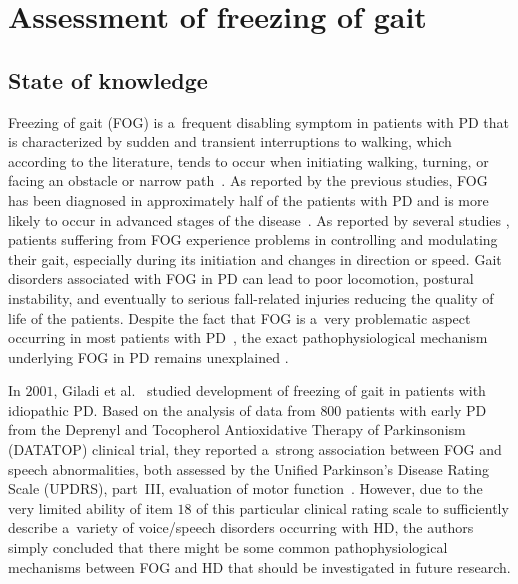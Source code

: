 \chapter[Assessment of freezing of gait]{Assessment of freezing of gait}
\label{ch6}

\section{State of knowledge}
\label{ch6_1}

Freezing of gait (FOG) is a~frequent disabling symptom in patients with PD that is characterized by sudden and transient interruptions to walking, which according to the literature, tends to occur when initiating walking, turning, or facing an obstacle or narrow path~\cite{Nutt2011}. As reported by the previous studies, FOG has been diagnosed in approximately half of the patients with PD and is more likely to occur in advanced stages of the disease~\cite{Bartels2003}. As reported by several studies \cite{Giladi1997, Giladi2001, Macht2007}, patients suffering from FOG experience problems in controlling and modulating their gait, especially during its initiation and changes in direction or speed. Gait disorders associated with FOG in PD \cite{Giladi1997, Giladi2001, Morris2001b} can lead to poor locomotion, postural instability, and eventually to serious fall-related injuries \cite{Gray2000, Schaafsma2003} reducing the quality of life of the patients. Despite the fact that FOG is a~very problematic aspect occurring in most patients with PD~\cite{Giladi2001c}, the exact pathophysiological mechanism underlying FOG in PD remains unexplained \cite{Shine2011, Vesely2016, Virmani2015}.

In $2001$, Giladi et al.~\cite{Giladi2001b} studied development of freezing of gait in patients with idiopathic PD. Based on the analysis of data from $800$ patients with early PD from the Deprenyl and Tocopherol Antioxidative Therapy of Parkinsonism (DATATOP) clinical trial, they reported a~strong association between FOG and speech abnormalities, both assessed by the Unified Parkinson's Disease Rating Scale (UPDRS), part~III, evaluation of motor function~\cite{Fahn1987}. However, due to the very limited ability of item $18$ of this particular clinical rating scale to sufficiently describe a~variety of voice/speech disorders occurring with HD, the authors simply concluded that there might be some common pathophysiological mechanisms between FOG and HD that should be investigated in future research.

